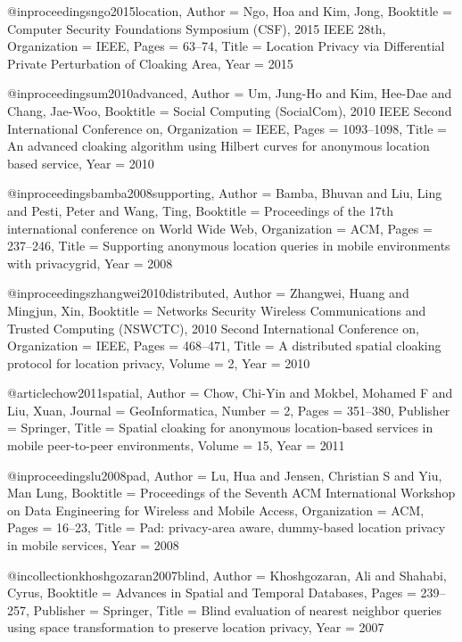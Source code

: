 {{@inproceedings{ngo2015location,
	Author = {Ngo, Hoa and Kim, Jong},
	Booktitle = {Computer Security Foundations Symposium (CSF), 2015 IEEE 28th},
	Organization = {IEEE},
	Pages = {63--74},
	Title = {Location Privacy via Differential Private Perturbation of Cloaking Area},
	Year = {2015}}


@inproceedings{um2010advanced,
	Author = {Um, Jung-Ho and Kim, Hee-Dae and Chang, Jae-Woo},
	Booktitle = {Social Computing (SocialCom), 2010 IEEE Second International Conference on},
	Organization = {IEEE},
	Pages = {1093--1098},
	Title = {An advanced cloaking algorithm using Hilbert curves for anonymous location based service},
	Year = {2010}}

@inproceedings{bamba2008supporting,
	Author = {Bamba, Bhuvan and Liu, Ling and Pesti, Peter and Wang, Ting},
	Booktitle = {Proceedings of the 17th international conference on World Wide Web},
	Organization = {ACM},
	Pages = {237--246},
	Title = {Supporting anonymous location queries in mobile environments with privacygrid},
	Year = {2008}}

@inproceedings{zhangwei2010distributed,
	Author = {Zhangwei, Huang and Mingjun, Xin},
	Booktitle = {Networks Security Wireless Communications and Trusted Computing (NSWCTC), 2010 Second International Conference on},
	Organization = {IEEE},
	Pages = {468--471},
	Title = {A distributed spatial cloaking protocol for location privacy},
	Volume = {2},
	Year = {2010}}

@article{chow2011spatial,
	Author = {Chow, Chi-Yin and Mokbel, Mohamed F and Liu, Xuan},
	Journal = {GeoInformatica},
	Number = {2},
	Pages = {351--380},
	Publisher = {Springer},
	Title = {Spatial cloaking for anonymous location-based services in mobile peer-to-peer environments},
	Volume = {15},
	Year = {2011}}

@inproceedings{lu2008pad,
	Author = {Lu, Hua and Jensen, Christian S and Yiu, Man Lung},
	Booktitle = {Proceedings of the Seventh ACM International Workshop on Data Engineering for Wireless and Mobile Access},
	Organization = {ACM},
	Pages = {16--23},
	Title = {Pad: privacy-area aware, dummy-based location privacy in mobile services},
	Year = {2008}}

@incollection{khoshgozaran2007blind,
	Author = {Khoshgozaran, Ali and Shahabi, Cyrus},
	Booktitle = {Advances in Spatial and Temporal Databases},
	Pages = {239--257},
	Publisher = {Springer},
	Title = {Blind evaluation of nearest neighbor queries using space transformation to preserve location privacy},
	Year = {2007}}

}}

